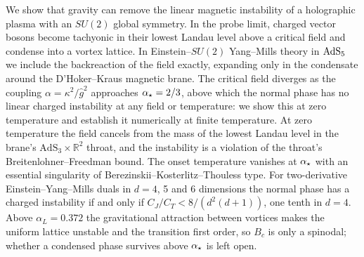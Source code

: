 We show that gravity can remove the linear magnetic instability of a holographic
plasma with an $SU(2)$ global symmetry. In the probe limit, charged vector
bosons become tachyonic in their lowest Landau level above a critical field
and condense into a vortex lattice. In Einstein--$SU(2)$ Yang--Mills theory
in $\mathrm{AdS}_5$ we include the backreaction of the field exactly, expanding only
in the condensate around the D'Hoker--Kraus magnetic brane. The critical
field diverges as the coupling $\alpha = \kappa^2/\hat g^2$ approaches
$\alpha_\star = 2/3$, above which the normal phase has no linear charged
instability at any field or temperature: we show this at zero temperature
and establish it numerically at finite temperature. At zero temperature the
field cancels from the mass of the lowest Landau level in the brane's
$\mathrm{AdS}_3 \times \mathbb{R}^2$ throat, and the instability is a
violation of the throat's Breitenlohner--Freedman bound. The onset
temperature vanishes at $\alpha_\star$ with an essential singularity of
Berezinskii--Kosterlitz--Thouless type. For two-derivative Einstein--Yang--Mills duals in $d = 4$, 5 and 6
dimensions the normal phase has a charged instability if and only if
$C_J/C_T < 8/(d^2(d+1))$, one tenth in $d = 4$. Above $\alpha_L = 0.372$
the gravitational attraction between vortices makes the uniform lattice
unstable and the transition first order, so $B_c$ is only a spinodal;
whether a condensed phase survives above $\alpha_\star$ is left open.
